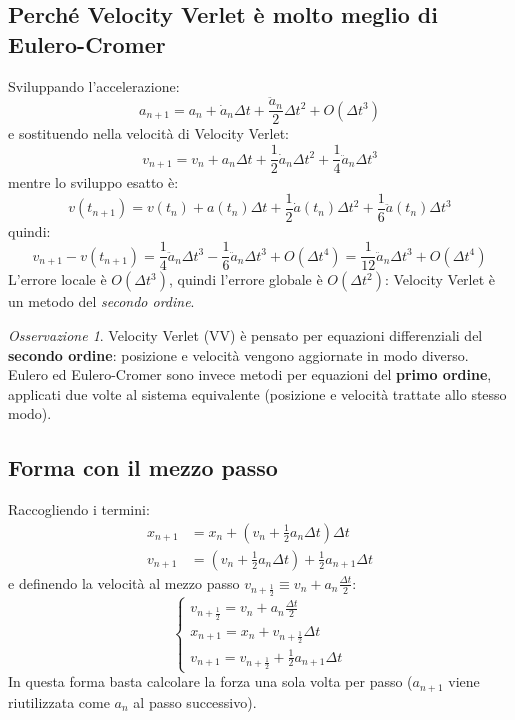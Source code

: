 \documentclass[11pt, a4paper, openright]{book}
\theoremstyle{plain}
\theoremstyle{definition}
\theoremstyle{remark}
\newtheorem{osservazione}[teorema]{Osservazione}
\begin{document}
\subsection{Perché Velocity Verlet è molto meglio di Eulero-Cromer}
Sviluppando l'accelerazione:
\begin{equation}
    a_{n + 1} = a_n + \dot{a}_n\Delta t + \frac{\ddot{a}_n}{2}\Delta t^2 + O(\Delta t^3)
\end{equation}
e sostituendo nella velocità di Velocity Verlet:
\begin{equation}
    v_{n + 1} = v_n + a_n\Delta t + \frac{1}{2}\dot{a}_n\Delta t^2 + \frac{1}{4}\ddot{a}_n\Delta t^3
\end{equation}
mentre lo sviluppo esatto è:
\begin{equation}
    v(t_{n + 1}) = v(t_n) + a(t_n)\Delta t + \frac{1}{2}\dot{a}(t_n)\Delta t^2 + \frac{1}{6}\ddot{a}(t_n)\Delta t^3
\end{equation}
quindi:
\begin{equation}
    v_{n + 1} - v(t_{n + 1}) = \frac{1}{4}\ddot{a}_n\Delta t^3 - \frac{1}{6}\ddot{a}_n\Delta t^3 + O(\Delta t^4) = \frac{1}{12}\ddot{a}_n\Delta t^3 + O(\Delta t^4)
\end{equation}
L'errore locale è $O(\Delta t^3)$, quindi l'errore globale è $O(\Delta t^2)$: Velocity Verlet è un metodo del \emph{secondo ordine}.

\begin{osservazione}
    Velocity Verlet (VV) è pensato per equazioni differenziali del \textbf{secondo ordine}: posizione e velocità vengono aggiornate in modo diverso. Eulero ed Eulero-Cromer sono invece metodi per equazioni del \textbf{primo ordine}, applicati due volte al sistema equivalente (posizione e velocità trattate allo stesso modo).
\end{osservazione}

\subsection{Forma con il mezzo passo}
Raccogliendo i termini:
\begin{align}
    x_{n + 1} &= x_n + \left(v_n + \frac{1}{2}a_n\Delta t\right)\Delta t \\
    v_{n + 1} &= \left(v_n + \frac{1}{2}a_n\Delta t\right) + \frac{1}{2}a_{n + 1}\Delta t
\end{align}
e definendo la velocità al mezzo passo $v_{n + \frac{1}{2}} \equiv v_n + a_n\frac{\Delta t}{2}$:
\begin{equation}
    \begin{cases}
        v_{n + \frac{1}{2}} = v_n + a_n\frac{\Delta t}{2} \\
        x_{n + 1} = x_n + v_{n + \frac{1}{2}}\Delta t \\
        v_{n + 1} = v_{n + \frac{1}{2}} + \frac{1}{2}a_{n + 1}\Delta t
    \end{cases}
\end{equation}
In questa forma basta calcolare la forza una sola volta per passo ($a_{n + 1}$ viene riutilizzata come $a_n$ al passo successivo).
\end{document}
